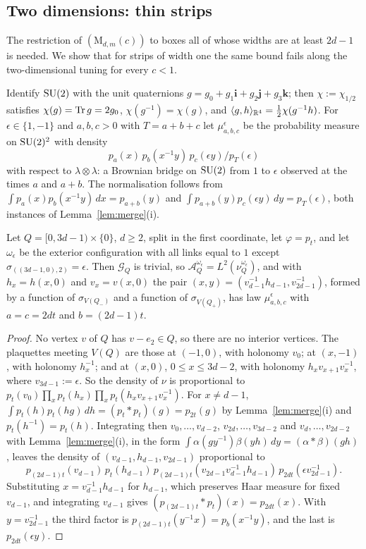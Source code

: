 \subsection{Two dimensions: thin strips}\label{ssec:strips}

The restriction of $(\mathrm M_{d,m}(c))$ to boxes all of whose widths are at
least $2d-1$ is needed. We show that for strips of width one the same bound
fails along the two-dimensional tuning for every $c<1$.

Identify $\mathrm{SU}(2)$ with the unit quaternions $g=g_0+g_1\mathbf i+g_2\mathbf j+g_3
\mathbf k$; then $\chi:=\chi_{1/2}$ satisfies $\chi(g)=\operatorname{Tr} g=2g_0$, $\chi(g^{-1})
=\chi(g)$, and $\langle g,h\rangle_{\mathbb{R}^4}=\frac12\chi(g^{-1}h)$. For $\epsilon\in\{1,-1\}$
and $a,b,c>0$ with $T=a+b+c$ let $\mu^\epsilon_{a,b,c}$ be the probability
measure on $\mathrm{SU}(2)^2$ with density
\[
p_a(x)\,p_b(x^{-1}y)\,p_c(\epsilon y)/p_T(\epsilon)
\]
with respect to $\lambda\otimes\lambda$: a Brownian bridge on $\mathrm{SU}(2)$ from $1$
to $\epsilon$ observed at the times $a$ and $a+b$. The normalisation follows
from $\int p_a(x)p_b(x^{-1}y)\,dx=p_{a+b}(y)$ and $\int p_{a+b}(y)p_c(\epsilon y)
\,dy=p_T(\epsilon)$, both instances of Lemma~\ref{lem:merge}(i).

\begin{lemma}\label{lem:striplaw}
Let $Q=[0,3d-1)\times\{0\}$, $d\ge2$, split in the first coordinate, let
$\varphi=p_t$, and let $\omega_\epsilon$ be the exterior configuration with all
links equal to $1$ except $\sigma_{((3d-1,0),2)}=\epsilon$. Then $\mathcal G_Q$
is trivial, so $\mathcal A^{\omega_\epsilon}_Q=L^2(\nu^{\omega_\epsilon}_Q)$,
and with $h_x=h(x,0)$ and $v_x=v(x,0)$ the pair $(x,y)=(v_{d-1}^{-1}h_{d-1},
v_{2d-1}^{-1})$, formed by a function of $\sigma_{V(Q_-)}$ and a function of
$\sigma_{V(Q_+)}$, has law $\mu^\epsilon_{a,b,c}$ with $a=c=2dt$ and
$b=(2d-1)t$.
\end{lemma}

\begin{proof}
No vertex $v$ of $Q$ has $v-e_2\in Q$, so there are no interior vertices. The
plaquettes meeting $V(Q)$ are those at $(-1,0)$, with holonomy $v_0$; at
$(x,-1)$, with holonomy $h_x^{-1}$; and at $(x,0)$, $0\le x\le3d-2$, with
holonomy $h_xv_{x+1}v_x^{-1}$, where $v_{3d-1}:=\epsilon$. So the density of
$\nu$ is proportional to $p_t(v_0)\prod_xp_t(h_x)\prod_xp_t(h_xv_{x+1}v_x^{-1})$.
For $x\ne d-1$, $\int p_t(h)p_t(hg)\,dh=(p_t*p_t)(g)=p_{2t}(g)$ by
Lemma~\ref{lem:merge}(i) and $p_t(h^{-1})=p_t(h)$. Integrating then
$v_0,\dots,v_{d-2}$, $v_{2d},\dots,v_{3d-2}$ and $v_d,\dots,v_{2d-2}$ with
Lemma~\ref{lem:merge}(i), in the form $\int\alpha(gy^{-1})\beta(yh)\,dy=(\alpha*
\beta)(gh)$, leaves the density of $(v_{d-1},h_{d-1},v_{2d-1})$ proportional to
\[
p_{(2d-1)t}(v_{d-1})\,p_t(h_{d-1})\,p_{(2d-1)t}(v_{2d-1}v_{d-1}^{-1}h_{d-1})\,
p_{2dt}(\epsilon v_{2d-1}^{-1}).
\]
Substituting $x=v_{d-1}^{-1}h_{d-1}$ for $h_{d-1}$, which preserves Haar measure
for fixed $v_{d-1}$, and integrating $v_{d-1}$ gives $(p_{(2d-1)t}*p_t)(x)=
p_{2dt}(x)$. With $y=v_{2d-1}^{-1}$ the third factor is $p_{(2d-1)t}(y^{-1}x)=
p_b(x^{-1}y)$, and the last is $p_{2dt}(\epsilon y)$.
\end{proof}

